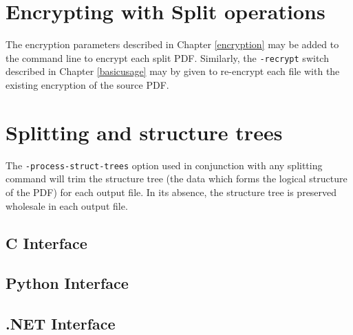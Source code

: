 \documentclass{book}
\begin{document}
\section{Encrypting with Split operations}
The encryption parameters described in Chapter \ref{encryption} may be added to the command line to encrypt each split PDF. Similarly, the \texttt{-recrypt} switch described in Chapter \ref{basicusage} may by given to re-encrypt each file with the existing encryption of the source PDF.

\section{Splitting and structure trees}

The \texttt{-process-struct-trees} option used in conjunction with any splitting command will trim the structure tree (the data which forms the logical structure of the PDF) for each output file. In its absence, the structure tree is preserved wholesale in each output file. 

\pagestyle{empty}\thispagestyle{fancy}

\begin{cpdflib}
\clearpage
\section*{C Interface}
\begin{small}\tt

\end{small}
\end{cpdflib}

\begin{pycpdflib}
\clearpage
\section*{Python Interface}
\begin{small}\tt

\end{small}
\end{pycpdflib}

\begin{dotnetcpdflib}
\clearpage
\section*{.NET Interface}
\begin{small}\tt

\end{small}
\end{dotnetcpdflib}
\end{document}
